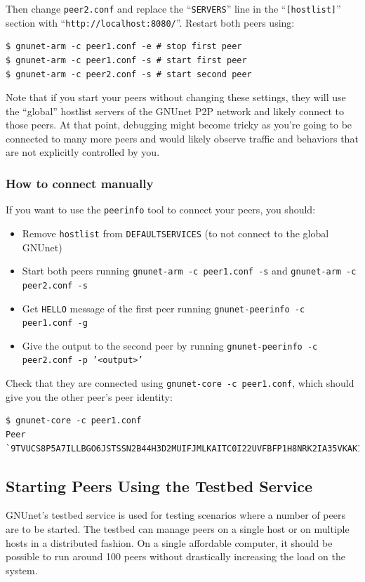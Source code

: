\documentclass[10pt]{article}
\begin{document}
Then change {\tt peer2.conf} and replace the ``\texttt{SERVERS}'' line in the ``\texttt{[hostlist]}'' section with
``\texttt{http://localhost:8080/}''.  Restart both peers using:
\begin{lstlisting}
$ gnunet-arm -c peer1.conf -e # stop first peer
$ gnunet-arm -c peer1.conf -s # start first peer
$ gnunet-arm -c peer2.conf -s # start second peer
\end{lstlisting}

Note that if you start your peers without changing these settings, they
will use the ``global'' hostlist servers of the GNUnet P2P network and
likely connect to those peers.  At that point, debugging might become
tricky as you're going to be connected to many more peers and would 
likely observe traffic and behaviors that are not explicitly controlled
by you.

\subsubsection{How to connect manually}
If you want to use the \texttt{peerinfo} tool to connect your peers, you should:
\begin{itemize}
\itemsep0em
 \item{Remove {\tt hostlist} from {\tt DEFAULTSERVICES} (to not connect to the global GNUnet)}
 \item{Start both peers running {\tt gnunet-arm -c peer1.conf -s} and {\tt gnunet-arm -c peer2.conf -s}}
 \item{Get \texttt{HELLO} message of the first peer running {\tt gnunet-peerinfo -c peer1.conf -g}}
 \item{Give the output to the second peer by running {\tt gnunet-peerinfo -c peer2.conf -p '<output>'}}
\end{itemize}

Check that they are connected using {\tt gnunet-core -c peer1.conf}, which should give you the other peer's 
peer identity:
\begin{lstlisting}
$ gnunet-core -c peer1.conf
Peer `9TVUCS8P5A7ILLBGO6JSTSSN2B44H3D2MUIFJMLKAITC0I22UVFBFP1H8NRK2IA35VKAK16LLO0MFS7TAQ9M1KNBJ4NGCHP3JPVULDG'
\end{lstlisting}

\subsection{Starting Peers Using the Testbed Service}

GNUnet's testbed service is used for testing scenarios where a number of peers
are to be started.  The testbed can manage peers on a single host or on multiple
hosts in a distributed fashion.  On a single affordable computer, it should be
possible to run around 100 peers without drastically increasing the load on the
system.
\end{document}

